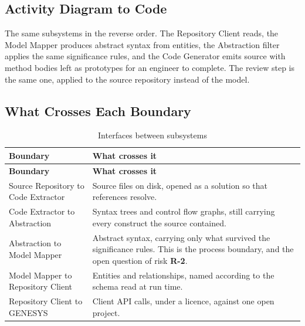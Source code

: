 \subsection{Activity Diagram to Code}

The same subsystems in the reverse order. The Repository Client reads, the Model
Mapper produces abstract syntax from entities, the Abstraction filter applies
the same significance rules, and the Code Generator emits source with method
bodies left as prototypes for an engineer to complete. The review step is the
same one, applied to the source repository instead of the model.

\subsection{What Crosses Each Boundary}

\begin{longtable}{L{0.38\textwidth}L{0.54\textwidth}}
	\caption{Interfaces between subsystems}\label{tab:interfaces}\\
	\toprule
	\textbf{Boundary} & \textbf{What crosses it} \\
	\midrule
	\endfirsthead
	\toprule
	\textbf{Boundary} & \textbf{What crosses it} \\
	\midrule
	\endhead

	Source Repository to Code Extractor & Source files on disk, opened as a
	solution so that references resolve. \\
	\addlinespace
	Code Extractor to Abstraction & Syntax trees and control flow graphs,
	still carrying every construct the source contained. \\
	\addlinespace
	Abstraction to Model Mapper & Abstract syntax, carrying only what survived
	the significance rules. This is the process boundary, and the open
	question of risk \textbf{R-2}. \\
	\addlinespace
	Model Mapper to Repository Client & Entities and relationships, named
	according to the schema read at run time. \\
	\addlinespace
	Repository Client to GENESYS & Client API calls, under a licence, against
	one open project. \\
	\bottomrule
\end{longtable}

